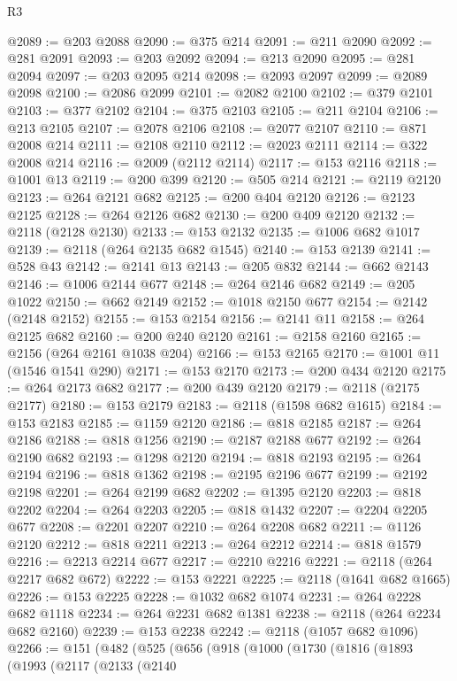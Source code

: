 \begin{lexlean}{R3}
\begin{coremodule}
@2089 := @203 @2088
@2090 := @375 @214
@2091 := @211 @2090
@2092 := @281 @2091
@2093 := @203 @2092
@2094 := @213 @2090
@2095 := @281 @2094
@2097 := @203 @2095 @214
@2098 := @2093 @2097
@2099 := @2089 @2098
@2100 := @2086 @2099
@2101 := @2082 @2100
@2102 := @379 @2101
@2103 := @377 @2102
@2104 := @375 @2103
@2105 := @211 @2104
@2106 := @213 @2105
@2107 := @2078 @2106
@2108 := @2077 @2107
@2110 := @871 @2008 @214
@2111 := @2108 @2110
@2112 := @2023 @2111
@2114 := @322 @2008 @214
@2116 := @2009 (@2112 @2114)
@2117 := @153 @2116
@2118 := @1001 @13
@2119 := @200 @399
@2120 := @505 @214
@2121 := @2119 @2120
@2123 := @264 @2121 @682
@2125 := @200 @404 @2120
@2126 := @2123 @2125
@2128 := @264 @2126 @682
@2130 := @200 @409 @2120
@2132 := @2118 (@2128 @2130)
@2133 := @153 @2132
@2135 := @1006 @682 @1017
@2139 := @2118 (@264 @2135 @682 @1545)
@2140 := @153 @2139
@2141 := @528 @43
@2142 := @2141 @13
@2143 := @205 @832
@2144 := @662 @2143
@2146 := @1006 @2144 @677
@2148 := @264 @2146 @682
@2149 := @205 @1022
@2150 := @662 @2149
@2152 := @1018 @2150 @677
@2154 := @2142 (@2148 @2152)
@2155 := @153 @2154
@2156 := @2141 @11
@2158 := @264 @2125 @682
@2160 := @200 @240 @2120
@2161 := @2158 @2160
@2165 := @2156 (@264 @2161 @1038 @204)
@2166 := @153 @2165
@2170 := @1001 @11 (@1546 @1541 @290)
@2171 := @153 @2170
@2173 := @200 @434 @2120
@2175 := @264 @2173 @682
@2177 := @200 @439 @2120
@2179 := @2118 (@2175 @2177)
@2180 := @153 @2179
@2183 := @2118 (@1598 @682 @1615)
@2184 := @153 @2183
@2185 := @1159 @2120
@2186 := @818 @2185
@2187 := @264 @2186
@2188 := @818 @1256
@2190 := @2187 @2188 @677
@2192 := @264 @2190 @682
@2193 := @1298 @2120
@2194 := @818 @2193
@2195 := @264 @2194
@2196 := @818 @1362
@2198 := @2195 @2196 @677
@2199 := @2192 @2198
@2201 := @264 @2199 @682
@2202 := @1395 @2120
@2203 := @818 @2202
@2204 := @264 @2203
@2205 := @818 @1432
@2207 := @2204 @2205 @677
@2208 := @2201 @2207
@2210 := @264 @2208 @682
@2211 := @1126 @2120
@2212 := @818 @2211
@2213 := @264 @2212
@2214 := @818 @1579
@2216 := @2213 @2214 @677
@2217 := @2210 @2216
@2221 := @2118 (@264 @2217 @682 @672)
@2222 := @153 @2221
@2225 := @2118 (@1641 @682 @1665)
@2226 := @153 @2225
@2228 := @1032 @682 @1074
@2231 := @264 @2228 @682 @1118
@2234 := @264 @2231 @682 @1381
@2238 := @2118 (@264 @2234 @682 @2160)
@2239 := @153 @2238
@2242 := @2118 (@1057 @682 @1096)
@2266 := @151
    (@482
      (@525
        (@656
          (@918
            (@1000
              (@1730
                (@1816
                  (@1893
                    (@1993
                      (@2117
                        (@2133
                          (@2140

\end{coremodule}
\end{lexlean}
